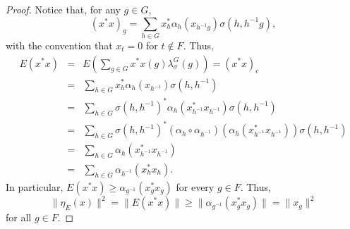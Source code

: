 \documentclass{amsart}
\numberwithin{equation}{section}
\newcommand{\1}{\mathbf{1}}
\begin{document}
\begin{proof}
Notice that, for any $g\in G$,
\[
(x^*x)_g = \sum_{h\in G}x^{*}_{h}\alpha_{h}(x_{h^{-1}g})\sigma(h, h^{-1}g),
\]
with the convention that $x_t=0$ for $t \notin F$. Thus,
\begin{eqnarray*}
E(x^*x)&=& E(\sum_{g\in G}x^*x(g)\lambda^{G}_{\sigma}(g))=(x^*x)_e\\
&=& \sum_{h\in G}x^{*}_{h}\alpha_{h}(x_{h^{-1}})\sigma(h, h^{-1})\\
&=& \sum_{h\in G}\sigma(h, h^{-1})^{*}\alpha_{h}(x^{*}_{h^{-1}}x_{h^{-1}})\sigma(h,h^{-1})\\
&=&\sum_{h\in G}\sigma(h, h^{-1})^{*}(\alpha_{h}\circ\alpha_{h^{-1}})(\alpha_{h}(x^{*}_{h^{-1}}x_{h^{-1}}))\sigma(h,h^{-1})\\
&=& \sum_{h\in G} \alpha_{h}(x^{*}_{h^{-1}}x_{h^{-1}})\\
&=& \sum_{h\in G} \alpha_{h^{-1}}(x^{*}_{h}x_{h}).
\end{eqnarray*} 
In particular, $E(x^*x)\geq \alpha_{g^{-1}}(x_{g}^*x_{g})$ for every $g\in F$. Thus,
\[
\|\eta_{E}(x)\|^{2}= \|E(x^*x)\|\geq \|\alpha_{g^{-1}}(x_{g}^*x_{g})\|=\|x_{g}\|^{2}
\]
for all $g\in F$.
\end{proof}
\end{document}
